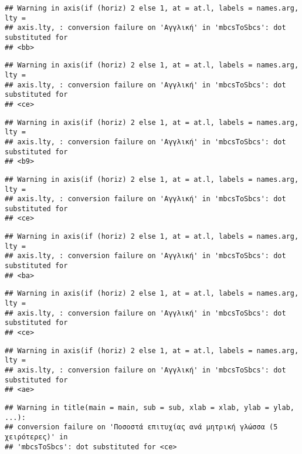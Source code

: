 \documentclass[
]{article}
\begin{document}
\begin{verbatim}
## Warning in axis(if (horiz) 2 else 1, at = at.l, labels = names.arg, lty =
## axis.lty, : conversion failure on 'Αγγλική' in 'mbcsToSbcs': dot substituted for
## <bb>
\end{verbatim}

\begin{verbatim}
## Warning in axis(if (horiz) 2 else 1, at = at.l, labels = names.arg, lty =
## axis.lty, : conversion failure on 'Αγγλική' in 'mbcsToSbcs': dot substituted for
## <ce>
\end{verbatim}

\begin{verbatim}
## Warning in axis(if (horiz) 2 else 1, at = at.l, labels = names.arg, lty =
## axis.lty, : conversion failure on 'Αγγλική' in 'mbcsToSbcs': dot substituted for
## <b9>
\end{verbatim}

\begin{verbatim}
## Warning in axis(if (horiz) 2 else 1, at = at.l, labels = names.arg, lty =
## axis.lty, : conversion failure on 'Αγγλική' in 'mbcsToSbcs': dot substituted for
## <ce>
\end{verbatim}

\begin{verbatim}
## Warning in axis(if (horiz) 2 else 1, at = at.l, labels = names.arg, lty =
## axis.lty, : conversion failure on 'Αγγλική' in 'mbcsToSbcs': dot substituted for
## <ba>
\end{verbatim}

\begin{verbatim}
## Warning in axis(if (horiz) 2 else 1, at = at.l, labels = names.arg, lty =
## axis.lty, : conversion failure on 'Αγγλική' in 'mbcsToSbcs': dot substituted for
## <ce>
\end{verbatim}

\begin{verbatim}
## Warning in axis(if (horiz) 2 else 1, at = at.l, labels = names.arg, lty =
## axis.lty, : conversion failure on 'Αγγλική' in 'mbcsToSbcs': dot substituted for
## <ae>
\end{verbatim}

\begin{verbatim}
## Warning in title(main = main, sub = sub, xlab = xlab, ylab = ylab, ...):
## conversion failure on 'Ποσοστά επιτυχίας ανά μητρική γλώσσα (5 χειρότερες)' in
## 'mbcsToSbcs': dot substituted for <ce>
\end{verbatim}
\end{document}
